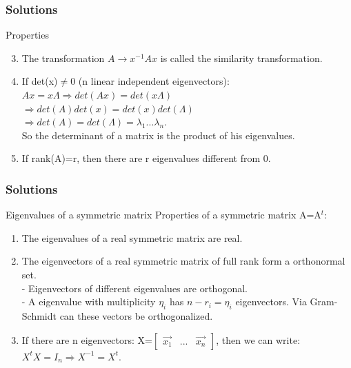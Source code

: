 \begin{frame}
	\frametitle{Solutions}
	\begin{block}{Properties}
		\begin{enumerate}
			\setcounter{enumi}{2}
			\item The transformation $A \rightarrow x^{-1}Ax$ is called the similarity transformation.
			\item If det(x)$\neq$0 (n linear independent eigenvectors): \\
			$Ax=x\Lambda \Rightarrow det(Ax)=det(x\Lambda)$\\
			$\Rightarrow det(A)det(x)=det(x)det(\Lambda)$\\ 
			$\Rightarrow det(A) = det(\Lambda)=\lambda_1...\lambda_n$. \\
			So the determinant of a matrix is the product of his eigenvalues. 
			\item If rank(A)=r, then there are r eigenvalues different from 0.
		\end{enumerate}
	\end{block}
\end{frame}

\begin{frame}
	\frametitle{Solutions}
	\begin{block}{Eigenvalues of a symmetric matrix}
		Properties of a symmetric matrix A=A$^t$:
		\begin{enumerate}
			\item The eigenvalues of a real symmetric matrix are real.
			\item The eigenvectors of a real symmetric matrix of full rank form a orthonormal set.\\
			- Eigenvectors of different eigenvalues are orthogonal.\\
			- A eigenvalue with multiplicity $\eta_i$ has $n-r_i=\eta_i$ eigenvectors. Via Gram-Schmidt can these vectors be orthogonalized.
			\item If there are n eigenvectors: X=$\begin{bmatrix}
			\overrightarrow{x_1}& ... & \overrightarrow{x_n}
			\end{bmatrix}$, then we can write: $X^tX=I_n \Rightarrow X^{-1}=X^t$.
		\end{enumerate}
	\end{block}
\end{frame}

